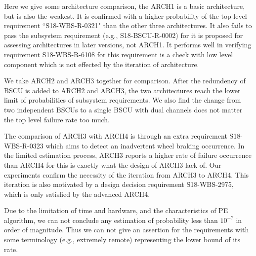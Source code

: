 Here we give some architecture comparison, the ARCH1 is a basic architecture, but is also the weakest. It is confirmed with a higher probability of the top level requirement ``S18-WBS-R-0321" than the other three architectures. It also fails to pass the subsystem requirement (e.g., S18-BSCU-R-0002) for it is proposed for assessing architectures in later versions, not ARCH1. It performs well in verifying requirement S18-WBS-R-6108 for this requirement is a check with low level component which is not effected by the iteration of architecture.

We take ARCH2 and ARCH3 together for comparison. After the redundency of BSCU is added to ARCH2 and ARCH3, the two architectures reach the lower limit of probabilities of subsystem requirements. We also find the change from two independent BSCUs to a single BSCU with dual channels does not matter the top level failure rate too much. 


The comparison of ARCH3 with ARCH4 is through an extra requirement S18-WBS-R-0323 which aims to detect an inadvertent wheel braking occurrence. In the limited estimation process, ARCH3 reports a higher rate of failure occurrence than ARCH4 for this is exactly what the design of ARCH3 lack of. Our experiments confirm the necessity of the iteration from ARCH3 to ARCH4. This iteration is also motivated by a design decision requirement S18-WBS-2975, which is only satisfied by the advanced ARCH4.

Due to the limitation of time and hardware, and the characteristics of PE algorithm, we can not conclude any estimation of probability less than $10^{-7}$ in order of magnitude. Thus we can not give an assertion for the requirements with some terminology (e.g., extremely remote) representing the lower bound of its rate.

